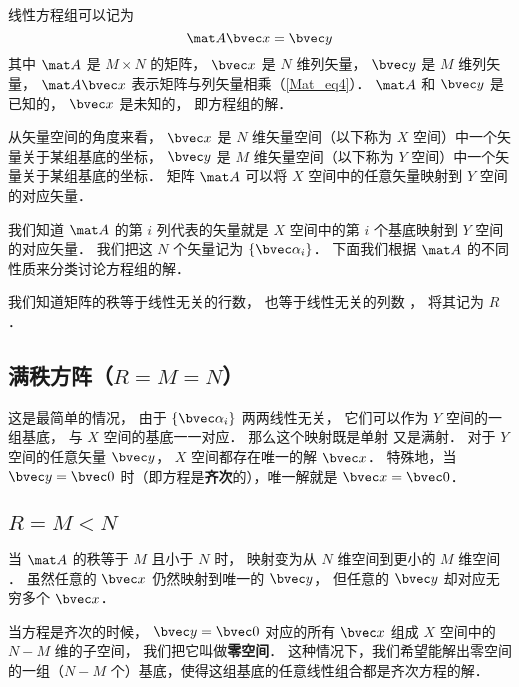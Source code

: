 

线性方程组可以记为
\begin{equation}\label{LinEq_eq1}
\mat A \bvec x = \bvec y
\end{equation}
其中 $\mat A$ 是 $M \times N$ 的矩阵， $\bvec x$ 是 $N$ 维列矢量， $\bvec y$ 是 $M$ 维列矢量， $\mat A \bvec x$ 表示矩阵与列矢量相乘（\autoref{Mat_eq4}）． $\mat A$ 和 $\bvec y$ 是已知的， $\bvec x$ 是未知的， 即方程组的解．

从矢量空间的角度来看， $\bvec x$ 是 $N$ 维矢量空间（以下称为 $X$ 空间）中一个矢量关于某组基底的坐标， $\bvec y$ 是 $M$ 维矢量空间（以下称为 $Y$ 空间）中一个矢量关于某组基底的坐标． 矩阵 $\mat A$ 可以将 $X$ 空间中的任意矢量映射到 $Y$ 空间的对应矢量．

我们知道 $\mat A$ 的第 $i$ 列代表的矢量就是 $X$ 空间中的第 $i$ 个基底映射到 $Y$ 空间的对应矢量． 我们把这 $N$ 个矢量记为 $\{\bvec \alpha_i\}$． 下面我们根据 $\mat A$ 的不同性质来分类讨论方程组的解．

我们知道矩阵的秩等于线性无关的行数， 也等于线性无关的列数%
， 将其记为 $R$．

\subsection{满秩方阵（$R = M = N$）}
这是最简单的情况， 由于 $\{\bvec \alpha_i\}$ 两两线性无关， 它们可以作为 $Y$ 空间的一组基底， 与 $X$ 空间的基底一一对应． 那么这个映射既是单射%
又是满射．%
对于 $Y$ 空间的任意矢量 $\bvec y$， $X$ 空间都存在唯一的解 $\bvec x$． 特殊地，当 $\bvec y = \bvec 0$ 时（即方程是\textbf{齐次}的），唯一解就是 $\bvec x = \bvec 0$．

\subsection{$R = M < N$}

当 $\mat A$ 的秩等于 $M$ 且小于 $N$ 时， 映射变为从 $N$ 维空间到更小的 $M$ 维空间 ． 虽然任意的 $\bvec x$ 仍然映射到唯一的 $\bvec y$， 但任意的 $\bvec y$ 却对应无穷多个 $\bvec x$． 


当方程是齐次的时候， $\bvec y = \bvec 0$ 对应的所有 $\bvec x$ 组成 $X$ 空间中的 $N- M$ 维的子空间， 我们把它叫做\textbf{零空间}． 这种情况下，我们希望能解出零空间的一组（$N - M$ 个）基底，使得这组基底的任意线性组合都是齐次方程的解．

